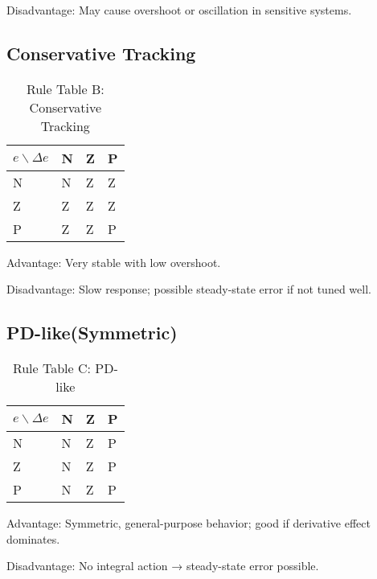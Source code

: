 Disadvantage: May cause overshoot or oscillation in sensitive systems.


\subsection{Conservative Tracking}
\begin{table}[h]
\centering
\caption{Rule Table B: Conservative Tracking}
\begin{tabular}{llll}
\toprule
{$e\backslash \Delta e$} & N & Z & P \\
\midrule
N & N & Z & Z \\
Z & Z & Z & Z \\
P & Z & Z & P \\
\bottomrule
\end{tabular}
\end{table}
Advantage: Very stable with low overshoot.

Disadvantage: Slow response; possible steady-state error if not tuned well.

\subsection{PD-like(Symmetric)}
\begin{table}[h]
\centering
\caption{Rule Table C: PD-like}
\begin{tabular}{llll}
\toprule
{$e\backslash \Delta e$} & N & Z & P \\
\midrule
N & N & Z & P \\
Z & N & Z & P \\
P & N & Z & P \\
\bottomrule
\end{tabular}
\end{table}
Advantage: Symmetric, general-purpose behavior; good if derivative effect dominates.

Disadvantage: No integral action → steady-state error possible.

